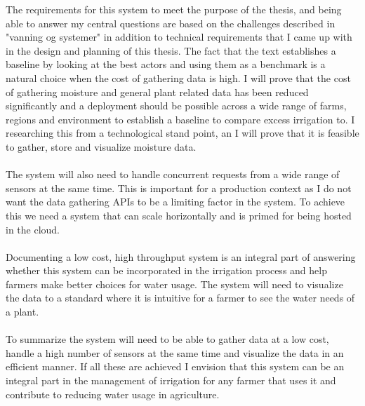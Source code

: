 \documentclass[]{uiophd}
\begin{document}
The requirements for this system to meet the purpose of the thesis, and being able to answer my central questions are based on the challenges described in "vanning og systemer" in addition to technical requirements that I came up with in the design and planning of this thesis. The fact that the text establishes a baseline by looking at the best actors and using them as a benchmark is a natural choice when the cost of gathering data is high. I will prove that the cost of gathering moisture and general plant related data has been reduced significantly and a deployment should be possible across a wide range of farms, regions and environment to establish a baseline to compare excess irrigation to. I researching this from a technological stand point, an I will prove that it is feasible to gather, store and visualize moisture data.
\\\\
The system will also need to handle concurrent requests from a wide range of sensors at the same time. This is important for a production context as I do not want the data gathering APIs to be a limiting factor in the system. To achieve this we need a system that can scale horizontally and is primed for being hosted in the cloud.
\\\\
Documenting a low cost, high throughput system is an integral part of answering whether this system can be incorporated in the irrigation process and help farmers make better choices for water usage. The system will need to visualize the data to a standard where it is intuitive for a farmer to see the water needs of a plant.
\\\\
To summarize the system will need to be able to gather data at a low cost, handle a high number of sensors at the same time and visualize the data in an efficient manner. If all these are achieved I envision that this system can be an integral part in the management of irrigation for any farmer that uses it and contribute to reducing water usage in agriculture.
\end{document}
